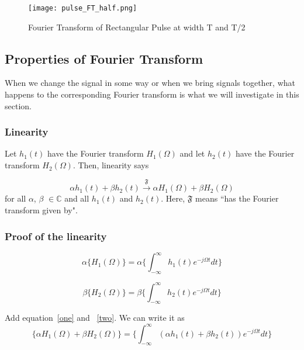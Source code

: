 \begin{figure}[htp]
\centering
\texttt{[image: pulse\_FT\_half.png]}
\caption{Fourier Transform of Rectangular Pulse at width T and T/2 }
\label{pulse_FT_half}
\end{figure}



\subsection{Properties of Fourier Transform}
When we change the signal in some way or when we bring signals together, what happens to the corresponding Fourier transform is what we will investigate in this section.

\subsubsection{Linearity}
Let $h_1(t)$ have the Fourier transform $H_1(\Omega)$ and let $h_2(t)$ have the Fourier transform $H_2(\Omega)$. Then, linearity says



\[\alpha h_1(t) + \beta h_2(t) \xrightarrow{\mathfrak{F}} \alpha H_1(\Omega)+ \beta H_2(\Omega)\]
for all $\alpha$, $\beta$ $\in \mathbb{C}$ and all $h_1(t)$ and $h_2(t)$. Here, ${\mathfrak{F}}$ means ``has the Fourier transform given by".

\subsubsection{Proof of the linearity}
\begin{equation}
 \alpha \{ H_1(\Omega) \} = \alpha \{ \int_{-\infty}^{\infty} {h_1(t)e^{-j\Omega t}} dt \}
\label{one}
\end{equation}

\begin{equation}
 \beta \{ H_2(\Omega) \} = \beta \{ \int_{-\infty}^{\infty} {h_2(t)e^{-j\Omega t}} dt \}
\label{two}
\end{equation}

Add equation~\ref{one} and ~\ref{two}. We can write it as
\begin{equation}
\{ \alpha H_1(\Omega) + \beta H_2(\Omega) \} = \{ \int_{-\infty}^{\infty} {(\alpha h_1(t) + \beta h_2(t))e^{-j\Omega t}} dt \}
\end{equation}

